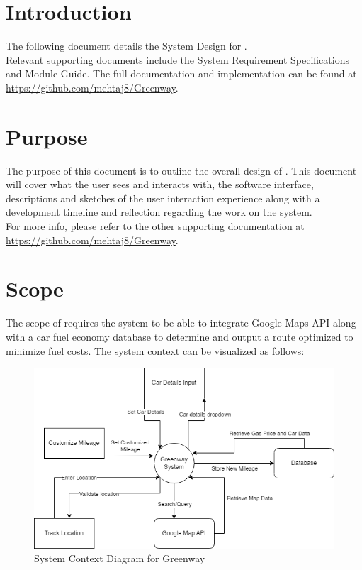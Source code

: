 \documentclass[12pt, titlepage]{article}
\begin{document}
\newpage

\tableofcontents

\newpage

\listoftables

\listoffigures

\newpage


\section{Introduction}

The following document details the System Design for \progname{}.\\
Relevant supporting documents include the System Requirement Specifications
and Module Guide. The full documentation and implementation can be
found at \url{https://github.com/mehtaj8/Greenway}.

\section{Purpose}

The purpose of this document is to outline the overall design of \progname{}. This document will cover what the user sees and interacts with, the software interface, descriptions and sketches of the user interaction experience along with a development timeline and reflection regarding the work on the system.\\

\noindent For more info, please refer to the other supporting documentation at \url{https://github.com/mehtaj8/Greenway}.

\section{Scope}
The scope of \progname{} requires the system to be able to integrate Google Maps API along with a car fuel economy database to determine and output a route optimized to minimize fuel costs. The system context can be visualized as follows: 
\begin{figure}[h!]
    \centering
    \includegraphics[scale=0.6]{Scope.png}
    \caption{System Context Diagram for Greenway}
\end{figure}
\end{document}
